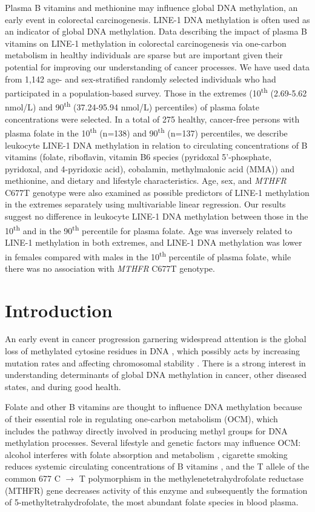 \noindent Plasma B vitamins and methionine may influence global DNA methylation, an early event in colorectal carcinogenesis. LINE-1 DNA methylation is often used as an indicator of global DNA methylation. Data describing the impact of plasma B vitamins on LINE-1 methylation in colorectal carcinogenesis via one-carbon metabolism in healthy individuals are sparse but are important given their potential for improving our understanding of cancer processes. We have used data from 1,142 age- and sex-stratified randomly selected individuals who had participated in a population-based survey. Those in the extremes (10\textsuperscript{th} (2.69-5.62 nmol/L) and 90\textsuperscript{th} (37.24-95.94 nmol/L) percentiles) of plasma folate concentrations were selected. In a total of 275 healthy, cancer-free persons with plasma folate in the 10\textsuperscript{th} (n=138) and 90\textsuperscript{th} (n=137) percentiles, we describe leukocyte LINE-1 DNA methylation in relation to circulating concentrations of B vitamins (folate, riboflavin, vitamin B6 species (pyridoxal 5'-phosphate, pyridoxal, and 4-pyridoxic acid), cobalamin, methylmalonic acid (MMA)) and methionine, and dietary and lifestyle characteristics. Age, sex, and \emph{MTHFR} C677T genotype were also examined as possible predictors of LINE-1 methylation in the extremes separately using multivariable linear regression. Our results suggest no difference in leukocyte LINE-1 DNA methylation between those in the 10\textsuperscript{th} and in the 90\textsuperscript{th} percentile for plasma folate. Age was inversely related to LINE-1 methylation in both extremes, and LINE-1 DNA methylation was lower in females compared with males in the 10\textsuperscript{th} percentile of plasma folate, while there was no association with \emph{MTHFR} C677T genotype.

\newpage

\section{Introduction} %
\noindent An early event in cancer progression garnering widespread attention is the global loss of methylated cytosine residues in DNA \cite{c31,c32}, which possibly acts by increasing mutation rates and affecting chromosomal stability \cite{c33,c34}. There is a strong interest in understanding determinants of global DNA methylation in cancer, other diseased states, and during good health.

\noindent Folate and other B vitamins are thought to influence DNA methylation because of their essential role in regulating one-carbon metabolism (OCM), which includes the pathway directly involved in producing methyl groups for DNA methylation processes. Several lifestyle and genetic factors may influence OCM: alcohol interferes with folate absorption and metabolism \cite{c35}, cigarette smoking reduces systemic circulating concentrations of B vitamins \cite{c36}, and the T allele of the common 677 C $\rightarrow$ T polymorphism in the methylenetetrahydrofolate reductase (MTHFR) gene decreases activity of this enzyme and subsequently the formation of 5-methyltetrahydrofolate, the most abundant folate species in blood plasma.

